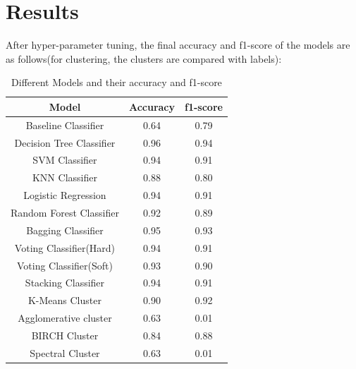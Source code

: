 \documentclass{article}
\begin{document}
\section{Results}

After hyper-parameter tuning, the final accuracy and f1-score of the models are as follows(for clustering, the clusters are compared with labels):

\begin{table}[H]
    \centering
    \begin{tabular}{|c|c|c|}
        \hline
        \textbf{Model} & \textbf{Accuracy} & \textbf{f1-score}\\
        \hline
        Baseline Classifier & 0.64 & 0.79 \\
        \hline
        Decision Tree Classifier & 0.96 & 0.94 \\
        \hline
        SVM Classifier & 0.94 & 0.91 \\
        \hline
        KNN Classifier & 0.88 & 0.80 \\
        \hline
        Logistic Regression & 0.94 & 0.91 \\
        \hline
        Random Forest Classifier & 0.92 & 0.89 \\
        \hline
        Bagging Classifier & 0.95 & 0.93 \\
        \hline
        Voting Classifier(Hard) & 0.94 & 0.91 \\
        \hline
        Voting Classifier(Soft) & 0.93 & 0.90 \\
        \hline
        Stacking Classifier & 0.94 & 0.91 \\
        \hline
        K-Means Cluster & 0.90 & 0.92 \\
        \hline
        Agglomerative cluster & 0.63 & 0.01 \\
        \hline
        BIRCH Cluster & 0.84 & 0.88 \\
        \hline
        Spectral Cluster & 0.63 & 0.01 \\
        \hline
    \end{tabular}
    \caption{Different Models and their accuracy and f1-score}
    \label{tab:result}
\end{table}
\end{document}
